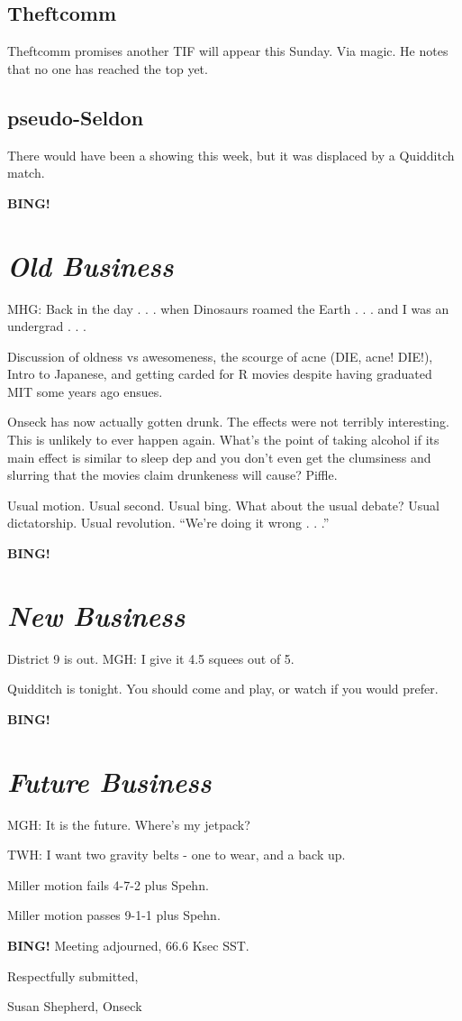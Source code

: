 \documentclass[10pt]{article}
\newcommand{\bing}{{\bf BING!} }
\newcommand{\goto}[1]{\bing \vskip 12pt \section*{{\em{#1}}}}
\newcommand{\ps}{ plus Spehn\xspace}
\begin{document}
\subsection*{Theftcomm}
Theftcomm promises another TIF will appear this Sunday. Via magic. He notes that no one has reached the top yet.

\subsection*{pseudo-Seldon}
There would have been a showing this week, but it was displaced by a Quidditch match.

\goto{Old Business}

MHG: Back in the day . . . when Dinosaurs roamed the Earth . . . and I was an undergrad . . .

Discussion of oldness vs awesomeness, the scourge of acne (DIE, acne! DIE!), Intro to Japanese, and getting carded for R movies despite having graduated MIT some years ago ensues.

Onseck has now actually gotten drunk. The effects were not terribly interesting. This is unlikely to ever happen again. What's the point of taking alcohol if its main effect is similar to sleep dep and you don't even get the clumsiness and slurring that the movies claim drunkeness will cause? Piffle.

Usual motion. Usual second. Usual bing. What about the usual debate? Usual dictatorship. Usual revolution. ``We're doing it wrong . . .''

\goto{New Business}

District 9 is out. MGH: I give it 4.5 squees out of 5.

Quidditch is tonight. You should come and play, or watch if you would prefer.

\goto{Future Business}

MGH: It is the future. Where's my jetpack?

TWH: I want two gravity belts - one to wear, and a back up.

Miller motion fails 4-7-2\ps.

Miller motion passes 9-1-1\ps.

\bing
\noindent
Meeting adjourned, 66.6 Ksec SST.

\vspace{18pt}

\centerline{Respectfully submitted,}
\centerline{Susan Shepherd, Onseck}
\end{document}
